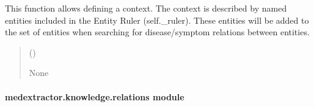 \documentclass[letterpaper,10pt,english]{sphinxmanual}
\begin{document}
\begin{fulllineitems}
\begin{fulllineitems}
\begin{quote}
\begin{description}
\end{description}\end{quote}

\end{fulllineitems}


\begin{fulllineitems}
\label{\detokenize{medextractor.knowledge:medextractor.knowledge.knowledge_extractor.KnowledgeExtractor.set_context}}
\pysigstartsignatures
{}
\pysigstopsignatures
\sphinxAtStartPar
This function allows defining a context. The context is described by
named entities included in the Entity Ruler (self.\_ruler). These entities will
be added to the set of entities when searching for disease/symptom relations
between entities.
\begin{quote}\begin{description}
\sphinxAtStartPar
{} (\sphinxstyleliteralemphasis{\sphinxupquote{\{\}}}\sphinxstyleliteralemphasis{\sphinxupquote{ (}}\sphinxstyleliteralemphasis{\sphinxupquote{)}}) \textendash{} 

\sphinxAtStartPar
None

\end{description}\end{quote}

\end{fulllineitems}


\end{fulllineitems}



\paragraph{medextractor.knowledge.relations module}
\label{\detokenize{medextractor.knowledge:module-medextractor.knowledge.relations}}\label{\detokenize{medextractor.knowledge:medextractor-knowledge-relations-module}}
\end{document}
